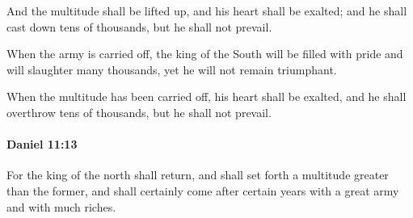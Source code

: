 			\begin{versebox}
					\item[BHS] 
					\item[LXX] 
					\item[ASV] And the multitude shall be lifted up, and his heart shall be exalted; and he shall cast down tens of thousands, but he shall not prevail.
					\item[NIV] When the army is carried off, the king of the South will be filled with pride and will slaughter many thousands, yet he will not remain triumphant.
					\item[NRSV] When the multitude has been carried off, his heart shall be exalted, and he shall overthrow tens of thousands, but he shall not prevail.
			\end{versebox}

		\paragraph{Daniel 11:13} %
			\label{DANIEL-11-13}

			For the king of the north shall return, and shall set forth a multitude greater than the former, and shall certainly come after certain years with a great army and with much riches.

